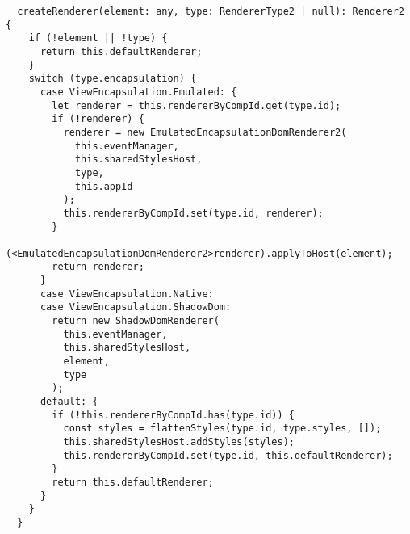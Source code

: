 \begin{verbatim}
  createRenderer(element: any, type: RendererType2 | null): Renderer2 {
    if (!element || !type) {
      return this.defaultRenderer;
    }
    switch (type.encapsulation) {
      case ViewEncapsulation.Emulated: {
        let renderer = this.rendererByCompId.get(type.id);
        if (!renderer) {
          renderer = new EmulatedEncapsulationDomRenderer2(
            this.eventManager,
            this.sharedStylesHost,
            type,
            this.appId
          );
          this.rendererByCompId.set(type.id, renderer);
        }
        (<EmulatedEncapsulationDomRenderer2>renderer).applyToHost(element);
        return renderer;
      }
      case ViewEncapsulation.Native:
      case ViewEncapsulation.ShadowDom:
        return new ShadowDomRenderer(
          this.eventManager,
          this.sharedStylesHost,
          element,
          type
        );
      default: {
        if (!this.rendererByCompId.has(type.id)) {
          const styles = flattenStyles(type.id, type.styles, []);
          this.sharedStylesHost.addStyles(styles);
          this.rendererByCompId.set(type.id, this.defaultRenderer);
        }
        return this.defaultRenderer;
      }
    }
  }
\end{verbatim}

